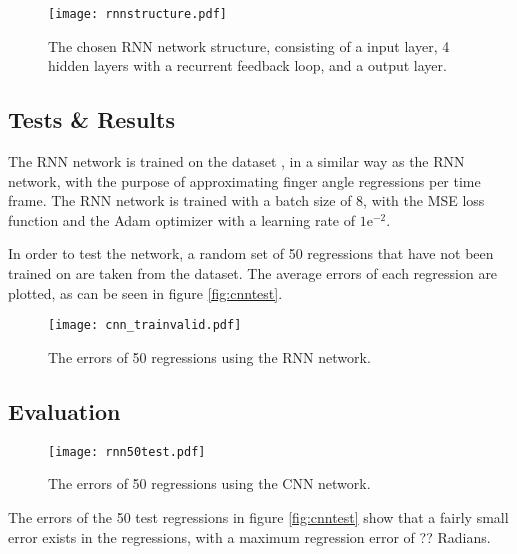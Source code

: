 \documentclass[../main.tex]{subfiles}
\begin{document}
\begin{figure}[H]
\begin{center}
\texttt{[image: rnnstructure.pdf]}
\caption{The chosen RNN network structure, consisting of a input layer, 4 hidden layers with a recurrent feedback loop, and a output layer.}
\label{fig:rnn_structure}
\end{center}
\end{figure}

\subsection{Tests \& Results}

The RNN network is trained on the dataset \cite{kinmusdataset}, in a similar way as the RNN network, with the purpose of approximating finger angle regressions per time frame.
The RNN network is trained with a batch size of 8, with the  MSE loss function and the Adam optimizer with a learning rate of $1\text{e}^{-2}$.

In order to test the network, a random set of 50 regressions that have not been trained on are taken from the dataset.
The average errors of each regression are plotted, as can be seen in figure \ref{fig:cnntest}.

\begin{figure}[H]
\begin{center}
\texttt{[image: cnn\_trainvalid.pdf]}
\caption{The errors of 50 regressions using the RNN network.}
\label{fig:rnntest}
\end{center}
\end{figure}


\subsection{Evaluation}

\begin{figure}[H]
\begin{center}
\texttt{[image: rnn50test.pdf]}
\caption{The errors of 50 regressions using the CNN network.}
\label{fig:rnntest}
\end{center}
\end{figure}


The errors of the 50 test regressions in figure \ref{fig:cnntest} show that a fairly small error exists in the regressions, with a maximum regression error of ?? Radians.
\end{document}
